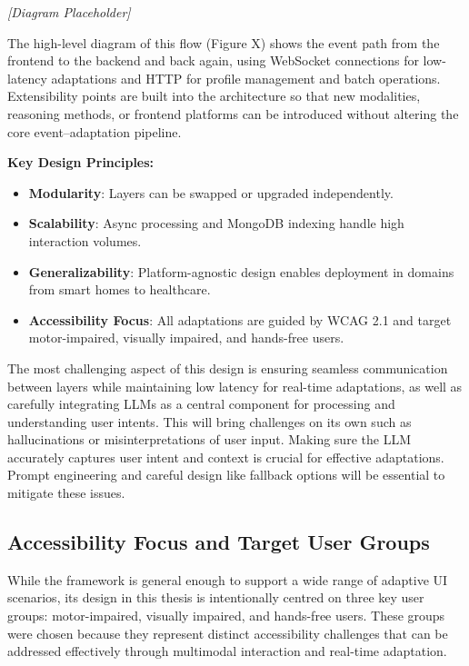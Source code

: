 \documentclass[openany]{book}
\begin{document}
\emph{[Diagram Placeholder]}

The high-level diagram of this flow (Figure X) shows the event path from the frontend to the backend and back again, using WebSocket connections for low-latency adaptations and HTTP for profile management and batch operations. Extensibility points are built into the architecture so that new modalities, reasoning methods, or frontend platforms can be introduced without altering the core event–adaptation pipeline.

\textbf{Key Design Principles:}
\begin{itemize}
\item \textbf{Modularity}: Layers can be swapped or upgraded independently.
\item \textbf{Scalability}: Async processing and MongoDB indexing handle high interaction volumes.
\item \textbf{Generalizability}: Platform-agnostic design enables deployment in domains from smart homes to healthcare.
\item \textbf{Accessibility Focus}: All adaptations are guided by WCAG 2.1 and target motor-impaired, visually impaired, and hands-free users.
\end{itemize}

The most challenging aspect of this design is ensuring seamless communication between layers while maintaining low latency for real-time adaptations, as well as carefully integrating LLMs as a central component for processing and understanding user intents. This will bring challenges on its own such as hallucinations or misinterpretations of user input. Making sure the LLM accurately captures user intent and context is crucial for effective adaptations. Prompt engineering and careful design like fallback options will be essential to mitigate these issues.

\subsection{Accessibility Focus and Target User Groups}
While the framework is general enough to support a wide range of adaptive UI scenarios, its design in this thesis is intentionally centred on three key user groups: motor-impaired, visually impaired, and hands-free users. These groups were chosen because they represent distinct accessibility challenges that can be addressed effectively through multimodal interaction and real-time adaptation.
\end{document}

